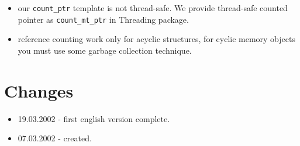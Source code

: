 \documentclass[10pt]{article}
\begin{document}
\begin{itemize}
  \item our \verb|count_ptr| template is not thread-safe. 
 We provide thread-safe counted pointer as \verb|count_mt_ptr| in 
 Threading package.
  \item reference counting work only for acyclic structures, for cyclic
 memory objects you must use some garbage collection technique.
\end{itemize}


\section{ Changes }

\begin{itemize}
 \item 19.03.2002 - first english version complete.
 \item 07.03.2002 - created.
\end{itemize}

 
 
\end{document}
